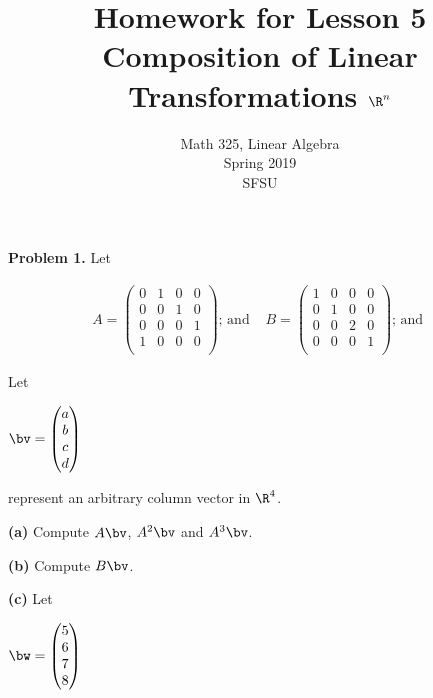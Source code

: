 \documentclass[oneside,12pt]{amsart}
\begin{document}
\title{Homework for Lesson 5 \\ Composition of Linear Transformations $\R^n$}
\author{Math 325, Linear Algebra \\ Spring 2019 \\ SFSU }
\date{}

\maketitle

\textbf{Problem 1.} Let

\smallskip

$$
\begin{matrix}
A = \begin{pmatrix}
0 & 1 & 0 & 0\\
0 & 0 & 1 & 0\\
0 & 0 & 0 & 1\\
1 & 0 & 0 & 0\\
\end{pmatrix}
\text{; and }
&
B = \begin{pmatrix}
1 & 0 & 0 & 0\\
0 & 1 & 0 & 0\\
0 & 0 & 2 & 0\\
0 & 0 & 0 & 1\\
\end{pmatrix}
\text{; and }
\end{matrix}
$$

 Let

\smallskip

$
\bv = \begin{pmatrix}
a \\
b \\
c \\
d \\
\end{pmatrix}
$

represent an arbitrary column vector in $\R^4$.

\smallskip

\textbf{(a)} Compute $A \bv$, $A^2 \bv$ and $A^3 \bv$.

\bigskip
\bigskip
\bigskip
\bigskip
\bigskip
\bigskip

\textbf{(b)} Compute $B \bv$.

\bigskip
\bigskip
\bigskip
\bigskip
\bigskip
\bigskip

\textbf{(c)} Let

\smallskip

$
\bw = \begin{pmatrix}
5 \\
6 \\
7 \\
8 \\
\end{pmatrix}
$
\bigskip
\bigskip
\bigskip
\end{document}
